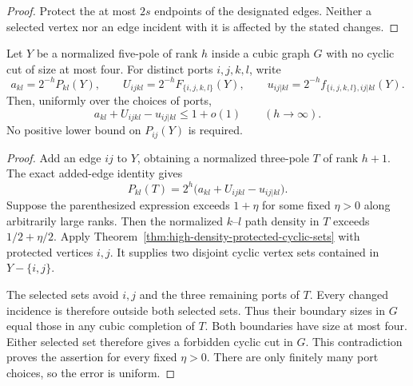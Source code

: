 \begin{proof}
Protect the at most $2s$ endpoints of the designated edges.
Neither a selected vertex nor an edge incident with it is affected by the stated changes.
\end{proof}

\begin{corollary}
\label{cor:five-pole-unconditional-added-edge}
Let $Y$ be a normalized five-pole of rank $h$ inside a cubic graph $G$ with no cyclic cut of size at most four.
For distinct ports $i,j,k,l$, write
\[
 a_{kl}=2^{-h}P_{kl}(Y),\qquad
 U_{ijkl}=2^{-h}F_{\{i,j,k,l\}}(Y),\qquad
 u_{ij|kl}=2^{-h}f_{\{i,j,k,l\},ij|kl}(Y).
\]
Then, uniformly over the choices of ports,
\[
 a_{kl}+U_{ijkl}-u_{ij|kl}\le1+o(1)
 \qquad(h\to\infty).
\]
No positive lower bound on $P_{ij}(Y)$ is required.
\end{corollary}

\begin{proof}
Add an edge $ij$ to $Y$, obtaining a normalized three-pole $T$ of rank $h+1$.
The exact added-edge identity gives
\[
 P_{kl}(T)
 =2^h\bigl(a_{kl}+U_{ijkl}-u_{ij|kl}\bigr).
\]
Suppose the parenthesized expression exceeds $1+\eta$ for some fixed $\eta>0$ along arbitrarily large ranks.
Then the normalized $k$--$l$ path density in $T$ exceeds $1/2+\eta/2$.
Apply Theorem~\ref{thm:high-density-protected-cyclic-sets} with protected vertices $i,j$.
It supplies two disjoint cyclic vertex sets contained in $Y-\{i,j\}$.

The selected sets avoid $i,j$ and the three remaining ports of $T$.
Every changed incidence is therefore outside both selected sets.
Thus their boundary sizes in $G$ equal those in any cubic completion of $T$.
Both boundaries have size at most four.
Either selected set therefore gives a forbidden cyclic cut in $G$.
This contradiction proves the assertion for every fixed $\eta>0$.
There are only finitely many port choices, so the error is uniform.
\end{proof}
